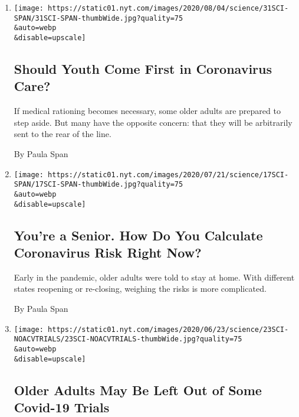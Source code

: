 \begin{enumerate}
\def\labelenumi{\arabic{enumi}.}
\item
  \href{/2020/07/31/health/coronavirus-ethics-rationing-elderly.html}{}

  \texttt{[image: https://static01.nyt.com/images/2020/08/04/science/31SCI-SPAN/31SCI-SPAN-thumbWide.jpg?quality=75\\\&auto=webp\\\&disable=upscale]}

  \hypertarget{should-youth-come-first-in-coronavirus-care}{%
  \subsection{Should Youth Come First in Coronavirus
  Care?}\label{should-youth-come-first-in-coronavirus-care}}

  If medical rationing becomes necessary, some older adults are prepared
  to step aside. But many have the opposite concern: that they will be
  arbitrarily sent to the rear of the line.

  By Paula Span
\item
  \href{/2020/07/17/health/seniors-coronavirus-reopenings.html}{}

  \texttt{[image: https://static01.nyt.com/images/2020/07/21/science/17SCI-SPAN/17SCI-SPAN-thumbWide.jpg?quality=75\\\&auto=webp\\\&disable=upscale]}

  \hypertarget{youre-a-senior-how-do-you-calculate-coronavirus-risk-right-now}{%
  \subsection{You're a Senior. How Do You Calculate Coronavirus Risk
  Right
  Now?}\label{youre-a-senior-how-do-you-calculate-coronavirus-risk-right-now}}

  Early in the pandemic, older adults were told to stay at home. With
  different states reopening or re-closing, weighing the risks is more
  complicated.

  By Paula Span
\item
  \href{/2020/06/19/health/vaccine-trials-elderly.html}{}

  \texttt{[image: https://static01.nyt.com/images/2020/06/23/science/23SCI-NOACVTRIALS/23SCI-NOACVTRIALS-thumbWide.jpg?quality=75\\\&auto=webp\\\&disable=upscale]}

  \hypertarget{older-adults-may-be-left-out-of-some-covid-19-trials}{%
  \subsection{Older Adults May Be Left Out of Some Covid-19
  Trials}\label{older-adults-may-be-left-out-of-some-covid-19-trials}}


\end{enumerate}
